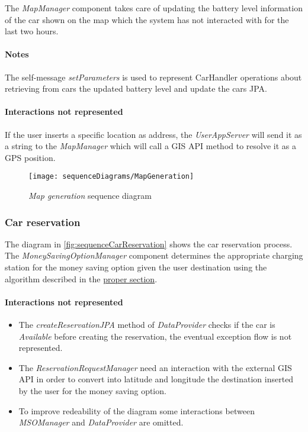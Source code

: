 The \emph{MapManager} component takes care of updating the battery level information of the car shown on the map which the system has not interacted with for the last two hours.

\paragraph{Notes} The self-message \emph{setParameters} is used to represent CarHandler operations about retrieving from cars the updated battery level and update the cars JPA.

\paragraph{Interactions not represented}
If the user inserts a specific location as address, the \emph{UserAppServer} will send it as a string to the \emph{MapManager} which will call a GIS API method to resolve it as a GPS position.


\begin{figure}[h!]
	\centering
	\texttt{[image: sequenceDiagrams/MapGeneration]}
	\caption{
		\label{fig:mapGeneration} 
		\emph{Map generation} sequence diagram
	}
\end{figure}

\clearpage
\subsubsection{Car reservation}
The diagram in \autoref{fig:sequenceCarReservation} shows the car reservation process.\\
The \mbox{\emph{MoneySavingOptionManager}} component determines the appropriate charging station for the money saving option given the user destination using the algorithm described in the \hyperref[sec:msoAlgorithm]{proper section}.

\paragraph{Interactions not represented}
\begin{itemize}
\item The \emph{createReservationJPA} method of \emph{DataProvider} checks if the car is \emph{Available} before creating the reservation, the eventual exception flow is not represented.
\item The \emph{ReservationRequestManager} need an interaction with the external GIS API in order to convert into latitude and longitude the destination inserted by the user for the money saving option.
\item To improve redeability of the diagram some interactions between \emph{MSOManager} and \emph{DataProvider} are omitted.
\end{itemize}

